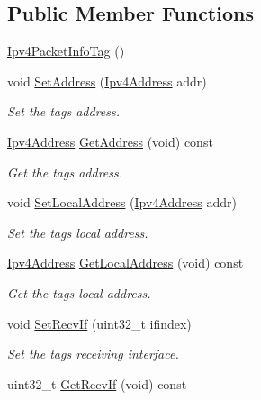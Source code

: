 \subsection*{Public Member Functions}
\begin{DoxyCompactItemize}
\item 
\hyperlink{classns3_1_1Ipv4PacketInfoTag_a720f6d9ae322b87451772913983ca494}{Ipv4\+Packet\+Info\+Tag} ()
\item 
void \hyperlink{classns3_1_1Ipv4PacketInfoTag_a7f9e7a59857929c135cec602da7243a7}{Set\+Address} (\hyperlink{classns3_1_1Ipv4Address}{Ipv4\+Address} addr)
\begin{DoxyCompactList}\small\item\em Set the tag\textquotesingle{}s address. \end{DoxyCompactList}\item 
\hyperlink{classns3_1_1Ipv4Address}{Ipv4\+Address} \hyperlink{classns3_1_1Ipv4PacketInfoTag_a067a3e0ed82916cb9a1ceb8c13a48348}{Get\+Address} (void) const 
\begin{DoxyCompactList}\small\item\em Get the tag\textquotesingle{}s address. \end{DoxyCompactList}\item 
void \hyperlink{classns3_1_1Ipv4PacketInfoTag_ad6bcefb65931fcff50d7fa5a004c7417}{Set\+Local\+Address} (\hyperlink{classns3_1_1Ipv4Address}{Ipv4\+Address} addr)
\begin{DoxyCompactList}\small\item\em Set the tag\textquotesingle{}s {\itshape local} address. \end{DoxyCompactList}\item 
\hyperlink{classns3_1_1Ipv4Address}{Ipv4\+Address} \hyperlink{classns3_1_1Ipv4PacketInfoTag_aae69da93a1072f0e5daaf521bee670be}{Get\+Local\+Address} (void) const 
\begin{DoxyCompactList}\small\item\em Get the tag\textquotesingle{}s {\itshape local} address. \end{DoxyCompactList}\item 
void \hyperlink{classns3_1_1Ipv4PacketInfoTag_a528562c576913273c1435f1e646ebaf7}{Set\+Recv\+If} (uint32\+\_\+t ifindex)
\begin{DoxyCompactList}\small\item\em Set the tag\textquotesingle{}s receiving interface. \end{DoxyCompactList}\item 
uint32\+\_\+t \hyperlink{classns3_1_1Ipv4PacketInfoTag_a9dd52a1b793ca1f69705f98ddc9aa7ed}{Get\+Recv\+If} (void) const 

\end{DoxyCompactItemize}
